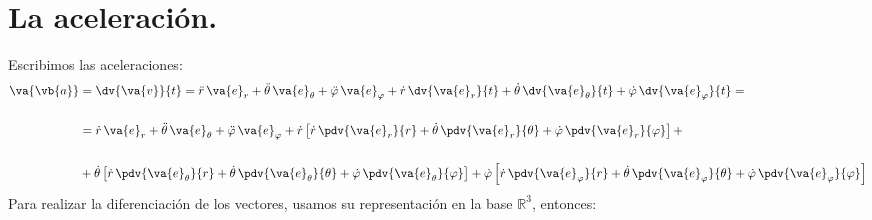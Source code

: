 \section{La aceleración.}
Escribimos las aceleraciones:
\begin{align*}
\va{\vb{a}} &= \dv{\va{v}}{t} = \ddot{r} \, \va{e}_{r} + \ddot{\theta} \, \va{e}_{\theta} + \ddot{\varphi} \, \va{e}_{\varphi} + \dot{r} \, \dv{\va{e}_{r}}{t} + \dot{\theta} \, \dv{\va{e}_{\theta}}{t} + \dot{\varphi} \, \dv{\va{e}_{\varphi}}{t} = \\[1.5em]
&= \dot{r} \, \va{e}_{r} + \ddot{\theta} \, \va{e}_{\theta} + \ddot{\varphi} \, \va{e}_{\varphi} + \dot{r} \left[ \dot{r} \, \pdv{\va{e}_{r}}{r} + \dot{\theta} \, \pdv{\va{e}_{r}}{\theta} + \dot{\varphi} \, \pdv{\va{e}_{r}}{\varphi} \right] + \\[1.5em]
&+ \dot{\theta} \left[ \dot{r} \, \pdv{\va{e}_{\theta}}{r} + \dot{\theta} \, \pdv{\va{e}_{\theta}}{\theta} + \dot{\varphi} \, \pdv{\va{e}_{\theta}}{\varphi} \right] + \dot{\varphi} \left[ \dot{r} \, \pdv{\va{e}_{\varphi}}{r} + \dot{\theta} \, \pdv{\va{e}_{\varphi}}{\theta} + \dot{\varphi} \, \pdv{\va{e}_{\varphi}}{\varphi} \right]
\end{align*}
Para realizar la diferenciación de los vectores, usamos su representación en la base $\mathbb{R}^{3}$, entonces:
